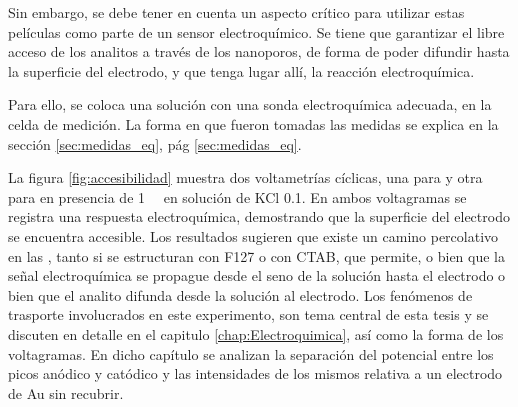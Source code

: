 			Sin embargo, se debe tener en cuenta un aspecto crítico para utilizar estas películas como parte de un sensor electroquímico. Se tiene que garantizar el libre acceso de los analitos a través de los nanoporos, de forma de poder difundir hasta la superficie del electrodo, y que tenga lugar allí, la reacción electroquímica.

			Para ello, se coloca una solución con una sonda electroquímica adecuada, en la celda de medición. La forma en que fueron tomadas las medidas se explica en la sección \ref{sec:medidas_eq}, pág \ref{sec:medidas_eq}. 

			La figura \ref{fig:accesibilidad} muestra dos voltametrías cíclicas, una para \pdmF\space y otra para \pdmC en presencia de \aminorutenio\space \SI{1}{\milli\Molar} en solución de KCl \SI{0.1}{\Molar}. En ambos voltagramas se registra una respuesta electroquímica, demostrando que la superficie del electrodo se encuentra accesible. Los resultados sugieren que existe un camino percolativo en las \pdm, tanto si se estructuran con F127 o con CTAB, que permite, o bien que la señal electroquímica se propague desde el seno de la solución hasta el electrodo o bien que el analito difunda desde la solución al electrodo. Los fenómenos de trasporte involucrados en este experimento, son tema central de esta tesis y se discuten en detalle en el capitulo \ref{chap:Electroquimica}, así como la forma de los voltagramas. En dicho capítulo se analizan la separación del potencial entre los picos anódico y catódico y las intensidades de los mismos relativa a un electrodo de Au sin recubrir. 

